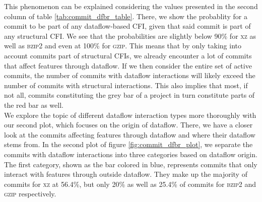 This phenomenon can be explained considering the values presented in the second column of table \ref{tab:commit_dfbr_table}.
There, we show the probablity for a commit to be part of any dataflow-based CFI, given that said commit is part of any structural CFI.
We see that the probabilities are slightly below 90\% for \textsc{xz} as well as \textsc{bzip2} and even at 100\% for \textsc{gzip}.
This means that by only taking into account commits part of structural CFIs, we already encounter a lot of commits that affect features through dataflow.
If we then consider the entire set of active commits, the number of commits with dataflow interactions will likely exceed the number of commits with structural interactions.
This also implies that most, if not all, commits constituting the grey bar of a project in turn constitute parts of the red bar as well. \\
\iffalse
Across all projects, the probability for a commit to interact with features through dataflow, given that it is part of structural CFIs, is much higher than the same probability for any active commit.
We consider this as a clear indication that our assumptions in section \ref{sec:combination_cfis}, that structural CFIs heavily coincide with dataflow-based CFIs, are correct.
Since our intent is to especially focus on commits whose interactions with features can only be discovered by employing our dataflow analysis, we quantified the respective commits in the investigated projects.
For this, we examine the relative difference between the percentages of commits with structural and commits with dataflow interactions.
This difference roughly determines what share of commits are part of the discussed more interesting dataflow interactions.
The difference is the smallest for \textsc{bzip2} at 10\% and slightly higher than that for \textsc{gzip} at 15\%.
\textsc{xz} has by far the biggest relative difference at almost 49\%, which means that our dataflow analysis reveals many additional interactions here. 
\fi
We explore the topic of different dataflow interaction types more thoroughly with our second plot, which focuses on the \textsf{origin} of dataflow.
There, we have a closer look at the commits affecting features through dataflow and where their dataflow stems from.
In the second plot of figure \ref{fig:commit_dfbr_plot}, we separate the commits with dataflow interactions into three categories based on dataflow origin.
The first category, shown as the bar colored in blue, represents commits that only interact with features through outside dataflow.
They make up the majority of commits for \textsc{xz} at 56.4\%, but only 20\% as well as 25.4\% of commits for \textsc{bzip2} and \textsc{gzip} respectively.
